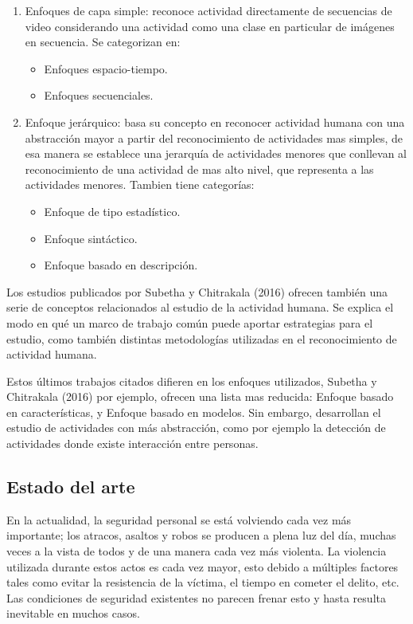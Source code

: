 \documentclass[a4paper,12pt,oneside,spanish]{book}
\begin{document}
\begin{enumerate}
	\setlength\itemsep{-1.9em}
	\item Enfoques de capa simple: reconoce actividad directamente de secuencias de video considerando una actividad como una clase en particular de imágenes en secuencia. Se categorizan en:
	\begin{itemize}
		\setlength\itemsep{-2.2em}
		\item Enfoques espacio-tiempo.\\	
		\item Enfoques secuenciales.\\
	\end{itemize}		
	\item Enfoque jerárquico: basa su concepto en reconocer actividad humana con una abstracción mayor a partir del reconocimiento de actividades mas simples, de esa manera se establece una jerarquía de actividades menores que conllevan al reconocimiento de una actividad de mas alto nivel, que representa a las actividades menores. Tambien tiene categorías: 
	\begin{itemize}
		\setlength\itemsep{-2.2em}
		\item Enfoque de tipo estadístico.\\	
		\item Enfoque sintáctico.\\
		\item Enfoque basado en descripción.\\
	\end{itemize}		
\end{enumerate}
 
Los estudios publicados por Subetha y Chitrakala (2016) ofrecen también una serie de conceptos relacionados al estudio de la actividad humana. Se explica el modo en qué un marco de trabajo común puede aportar estrategias para el estudio, como también distintas metodologías utilizadas en el reconocimiento de actividad humana.\par

Estos últimos trabajos citados difieren en los enfoques utilizados, Subetha y Chitrakala (2016) por ejemplo, ofrecen una lista mas reducida: Enfoque basado en características, y Enfoque basado en modelos. Sin embargo, desarrollan el estudio de actividades con más abstracción, como por ejemplo la detección de actividades donde existe interacción entre personas. \par


\newpage
\subsection{Estado del arte}
En la actualidad, la seguridad personal se está volviendo cada vez más importante; los atracos, asaltos y robos se producen a plena luz del día, muchas veces a la vista de todos y de una manera cada vez más violenta. La violencia utilizada durante estos actos es cada vez mayor, esto debido a múltiples factores tales como evitar la resistencia de la víctima, el tiempo en cometer el delito, etc. Las condiciones de seguridad existentes no parecen frenar esto y hasta resulta inevitable en muchos casos. \par
\end{document}
